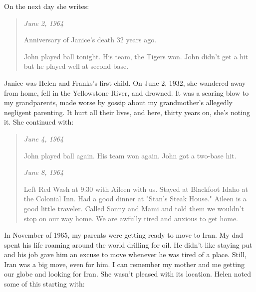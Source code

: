 On the next day she writes:

\begin{quote}
\emph{June 2, 1964}

Anniversary of Janice's death 32 years ago. 

John played ball tonight.
His team, the Tigers won. John didn't get a hit but he played well at
second base.
\end{quote}

Janice was Helen and Franks's first child. On June 2, 1932, she wandered
away from home, fell in the Yellowstone River, and drowned. It was a
searing blow to my grandparents, made worse by gossip about my
grandmother's allegedly negligent parenting. It hurt all their lives,
and here, thirty years on, she's noting it. She continued with:

\begin{quote}
\emph{June 4, 1964}

John played ball again. His team won again. John got a two-base hit.

\emph{June 8, 1964}

Left Red Wash at 9:30 with Aileen with us. Stayed at Blackfoot Idaho at
the Colonial Inn. Had a good dinner at "Stan's Steak House." Aileen is a
good little traveler. Called Sonny and Mami and told them we wouldn't
stop on our way home. We are awfully tired and anxious to get home.
\end{quote}

In November of 1965, my parents were getting ready to move to Iran. My
dad spent his life roaming around the world drilling for oil. He didn't
like staying put and his job gave him an excuse to move whenever he was
tired of a place. Still, Iran was a big move, even for him. I can
remember my mother and me getting our globe and looking for Iran. She
wasn't pleased with its location. Helen noted some of this starting
with:

